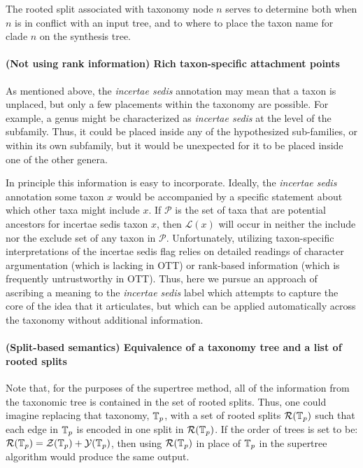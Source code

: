 \documentclass[english]{article}
\begin{document}
The rooted split associated with taxonomy node $n$ serves to determine both when $n$ is in conflict
with an input tree, and to where to place the taxon name for clade $n$ on the synthesis tree.

\paragraph{(Not using rank information) Rich taxon-specific attachment points}
As mentioned above, the \emph{incertae sedis} annotation may mean that a taxon is
unplaced, but only a few placements within the taxonomy are possible.
For example, a genus might be characterized as \emph{incertae sedis}
at the level of the subfamily.
Thus, it could be placed inside any of the
hypothesized sub-families, or within its own subfamily, but it would
be unexpected for it to be placed inside one of the other genera.

In principle this information is easy to incorporate.
Ideally, the \emph{incertae sedis}
annotation some taxon $x$ would be accompanied by a specific
statement about which other taxa might include $x$.
If $\mathcal{P}$ is the set of taxa that are potential ancestors for
incertae sedis taxon $x$, then $\mathcal{L}(x)$ will occur in neither
the include nor the exclude set of any taxon in $\mathcal{P}$.
Unfortunately, utilizing taxon-specific interpretations of the
incertae sedis flag relies on detailed readings of character argumentation
(which is lacking in OTT) or rank-based information (which is frequently
untrustworthy in OTT).
Thus, here we pursue an approach of ascribing a
meaning to the \emph{incertae sedis} label which attempts to capture
the core of the idea that it articulates, but which can be applied
automatically across the taxonomy without additional information.

\paragraph{(Split-based semantics) Equivalence of a taxonomy tree and a list of rooted splits}

Note that, for the purposes of the supertree method, all of the information from
the taxonomic tree is contained in the set of rooted splits. Thus, one could
imagine replacing that taxonomy, $\mbox{\ensuremath{\mathbb{T}}}_{p}$, with a set of rooted splits $\mathcal{R}(\mbox{\ensuremath{\mathbb{T}}}_{p})$ such that
each edge in $\mbox{\ensuremath{\mathbb{T}}}_{p}$ is encoded in one split in $\mathcal{R}(\mbox{\ensuremath{\mathbb{T}}}_{p})$. If the order of trees is set
to be: $\mathcal{R}(\mbox{\ensuremath{\mathbb{T}}}_{p})=\mathcal{Z}(\mbox{\ensuremath{\mathbb{T}}}_{p}) + 
\mathcal{Y}(\mbox{\ensuremath{\mathbb{T}}}_{p})$, then using $\mathcal{R}(\mbox{\ensuremath{\mathbb{T}}}_{p})$ in place of $\mbox{\ensuremath{\mathbb{T}}}_{p}$ in the supertree
algorithm would produce the same output.
\end{document}
